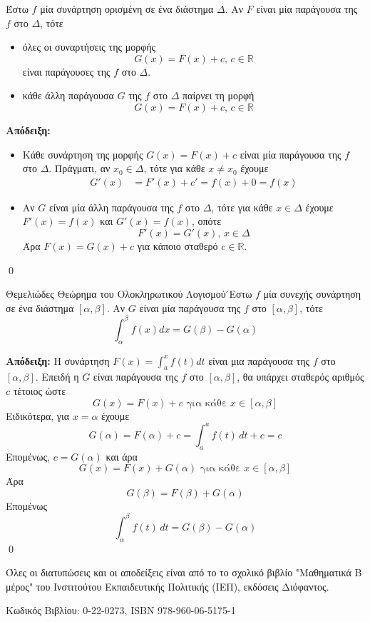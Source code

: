 \documentclass[a4paper, 12pt]{article}
\renewenvironment{proof}[1][\textbf{Απόδειξη}]{%
  \par\noindent\textbf{#1:} \rmfamily}{\qed\par}
\begin{document}
\begin{theorem}{}
  Έστω $f$ μία συνάρτηση ορισμένη σε ένα διάστημα $Δ$. Αν $F$ είναι μία παράγουσα της $f$ στο $Δ$, τότε
  \begin{itemize}
    \item όλες οι συναρτήσεις της μορφής
          $$G(x)=F(x)+c \text{, } c\in\mathbb{R}$$
          είναι παράγουσες της $f$ στο $Δ$.
    \item κάθε άλλη παράγουσα $G$ της $f$ στο $Δ$ παίρνει τη μορφή
          $$G(x)=F(x)+c \text{, } c\in\mathbb{R}$$
  \end{itemize}
\end{theorem}
\begin{proof}
  \begin{itemize}
    \item Κάθε συνάρτηση της μορφής $G(x)=F(x)+c$ είναι μία παράγουσα της $f$ στο $Δ$.
          Πράγματι, αν $x_0\in Δ$, τότε για κάθε $x\ne x_0$ έχουμε
          \begin{align*}
            G'(x) & =F'(x)+c'=f(x)+0 =f(x)
          \end{align*}

    \item Αν $G$ είναι μία άλλη παράγουσα της $f$ στο $Δ$, τότε για κάθε $x\in Δ$ έχουμε $F'(x)=f(x)$ και $G'(x)=f(x)$, οπότε
          $$F'(x)=G'(x) \text{, } x\in Δ$$
          Άρα $F(x)=G(x)+c$ για κάποιο σταθερό $c\in\mathbb{R}$.
  \end{itemize}
\end{proof}

\begin{theorem}{Θεμελιώδες Θεώρημα του Ολοκληρωτικού Λογισμού}
  ́Εστω $f$ μία συνεχής συνάρτηση σε ένα διάστημα $[α, β]$. Αν $G$ είναι
  μία παράγουσα της $f$ στο $[α, β]$, τότε
  $$\int_{α}^{β} f(x)dx=G(β)-G(α)$$
\end{theorem}
\begin{proof}
  Η συνάρτηση $F(x)=\int_{a}^{x} f(t)dt$ είναι μια παράγουσα της $f$ στο $[α, β]$. Επειδή η $G$ είναι παράγουσα της $f$ στο $[α, β]$, θα υπάρχει σταθερός αριθμός $c$ τέτοιος ώστε
  $$G(x)=F(x)+c \text{ για κάθε } x\in [α, β]$$
  Ειδικότερα, για $x=α$ έχουμε
  $$G(α)=F(α)+c=\int_{a}^{a}f(t)\,dt+c=c$$
  Επομένως, $c=G(α)$ και άρα
  $$G(x)=F(x)+G(α) \text{ για κάθε } x\in [α, β]$$
  Άρα
  $$G(β)=F(β)+G(α)$$
  Επομένως
  $$\int_{α}^{β} f(t)\,dt=G(β)-G(α)$$
\end{proof}

\vfill

Όλες οι διατυπώσεις και οι αποδείξεις είναι από το το σχολικό βιβλίο "Μαθηματικά Β μέρος" του Ινστιτούτου Εκπαιδευτικής Πολιτικής (ΙΕΠ), εκδόσεις Διόφαντος.

Κωδικός Βιβλίου: 0-22-0273, ISBN 978-960-06-5175-1
\end{document}
